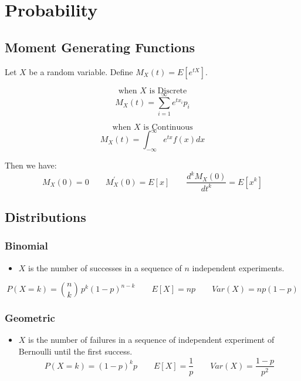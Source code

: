 \section{Probability}

\subsection{Moment Generating Functions}

Let $X$ be a random variable. Define $M_X(t) = E[e^{tX}]$.
\begin{minipage}{.23\textwidth}
$$\text{when }X\text{ is Discrete}$$
$$M_X(t) = \sum_{i=1}^{\infty} e^{tx_i}p_i$$
\end{minipage}
\begin{minipage}{.23\textwidth}
$$\text{when }X \text{ is Continuous}$$
$$M_X(t) = \int_{-\infty}^{\infty} e^{tx}f(x)dx$$
\end{minipage}

Then we have:
$$M_X(0) = 0 \qquad M_{X}^{'}(0) = E[x] \qquad  \frac{d^k M_{X} (0)}{d t^k} = E[x^k]$$

\subsection{Distributions}
\subsubsection{Binomial}

\begin{itemize}
\item  $X$ is the number of successes in a sequence of $n$ independent experiments.
\end{itemize}
$$P(X = k) = \binom{n}{k}\,p^{k}(1-p)^{n-k} \qquad E[X] = np \qquad Var(X) = np(1-p)$$

\subsubsection{Geometric}
\begin{itemize}
\item $X$ is the number of failures in a sequence of independent experiment of Bernoulli until the first success. 
$$P(X = k) = (1-p)^{k}p \qquad E[X] = \frac{1}{p} \qquad Var(X) = \frac{1-p}{p^2}$$

\end{itemize}

